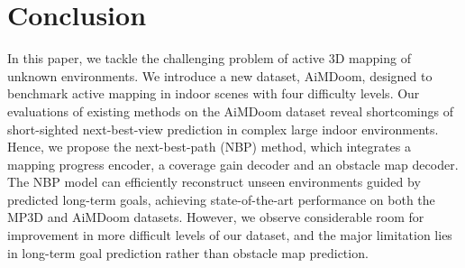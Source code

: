 \section{Conclusion}

In this paper, we tackle the challenging problem of active 3D mapping of unknown environments.
We introduce a new dataset, AiMDoom, designed to benchmark active mapping in indoor scenes with four difficulty levels. Our evaluations of existing methods on the AiMDoom dataset reveal shortcomings of short-sighted next-best-view prediction in complex large indoor environments.
Hence, we propose the next-best-path (NBP) method, which integrates a mapping progress encoder, a coverage gain decoder and an obstacle map decoder. The NBP model can efficiently reconstruct unseen environments guided by predicted long-term goals, achieving state-of-the-art performance on both the MP3D and AiMDoom datasets. 
However, we observe considerable room for improvement in more difficult levels of our dataset, and the major limitation lies in long-term goal prediction rather than obstacle map prediction.